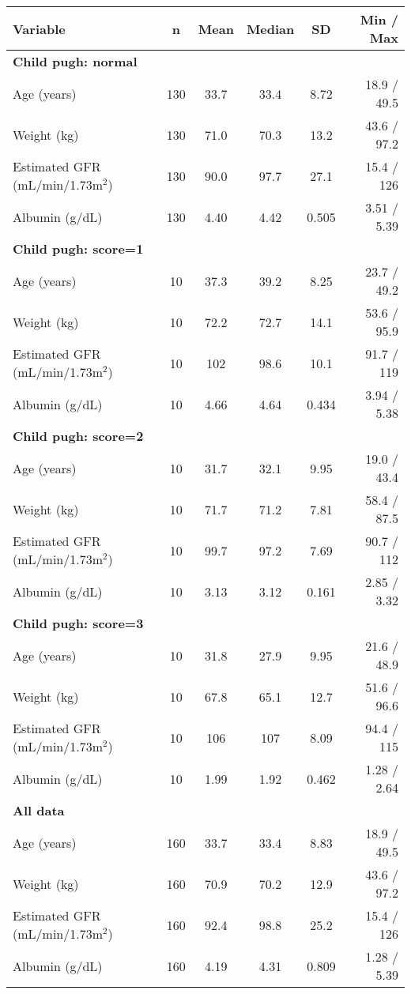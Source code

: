 \setlength{\tabcolsep}{5pt} 
\begin{threeparttable}
\renewcommand{\arraystretch}{1.3}
\begin{tabular}[h]{lccccr}
\hline
Variable & n & Mean & Median & SD & Min / Max \\
\hline
\multicolumn{6}{l}{\textbf{Child pugh: normal}}\\%
Age (years) & 130 & 33.7 & 33.4 & 8.72 & 18.9 / 49.5 \\
Weight (kg) & 130 & 71.0 & 70.3 & 13.2 & 43.6 / 97.2 \\
Estimated GFR (mL/min/1.73m$^2$) & 130 & 90.0 & 97.7 & 27.1 & 15.4 / 126 \\
Albumin (g/dL) & 130 & 4.40 & 4.42 & 0.505 & 3.51 / 5.39 \\
\hline \multicolumn{6}{l}{\textbf{Child pugh: score=1}}\\%
Age (years) & 10 & 37.3 & 39.2 & 8.25 & 23.7 / 49.2 \\
Weight (kg) & 10 & 72.2 & 72.7 & 14.1 & 53.6 / 95.9 \\
Estimated GFR (mL/min/1.73m$^2$) & 10 & 102 & 98.6 & 10.1 & 91.7 / 119 \\
Albumin (g/dL) & 10 & 4.66 & 4.64 & 0.434 & 3.94 / 5.38 \\
\hline \multicolumn{6}{l}{\textbf{Child pugh: score=2}}\\%
Age (years) & 10 & 31.7 & 32.1 & 9.95 & 19.0 / 43.4 \\
Weight (kg) & 10 & 71.7 & 71.2 & 7.81 & 58.4 / 87.5 \\
Estimated GFR (mL/min/1.73m$^2$) & 10 & 99.7 & 97.2 & 7.69 & 90.7 / 112 \\
Albumin (g/dL) & 10 & 3.13 & 3.12 & 0.161 & 2.85 / 3.32 \\
\hline \multicolumn{6}{l}{\textbf{Child pugh: score=3}}\\%
Age (years) & 10 & 31.8 & 27.9 & 9.95 & 21.6 / 48.9 \\
Weight (kg) & 10 & 67.8 & 65.1 & 12.7 & 51.6 / 96.6 \\
Estimated GFR (mL/min/1.73m$^2$) & 10 & 106 & 107 & 8.09 & 94.4 / 115 \\
Albumin (g/dL) & 10 & 1.99 & 1.92 & 0.462 & 1.28 / 2.64 \\
\hline \multicolumn{6}{l}{\textbf{All data}}\\%
Age (years) & 160 & 33.7 & 33.4 & 8.83 & 18.9 / 49.5 \\
Weight (kg) & 160 & 70.9 & 70.2 & 12.9 & 43.6 / 97.2 \\
Estimated GFR (mL/min/1.73m$^2$) & 160 & 92.4 & 98.8 & 25.2 & 15.4 / 126 \\
Albumin (g/dL) & 160 & 4.19 & 4.31 & 0.809 & 1.28 / 5.39 \\
\hline
\end{tabular}
\end{threeparttable}
